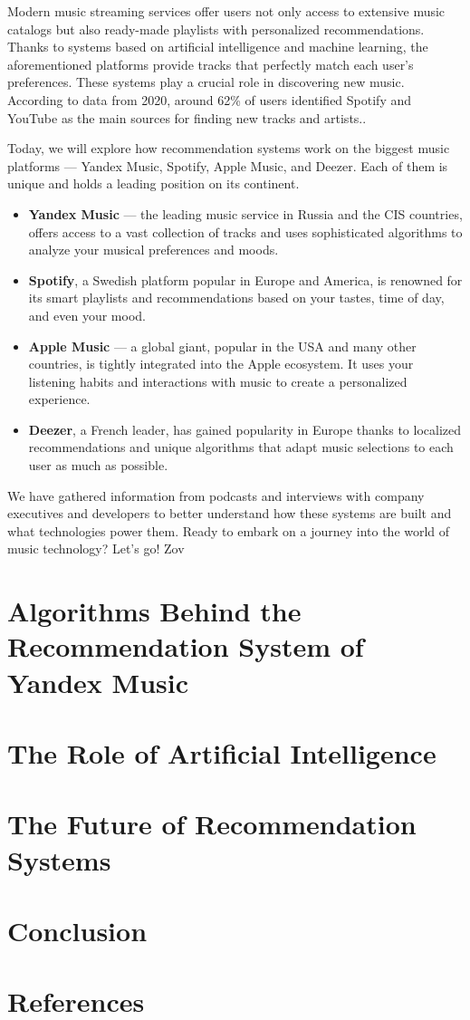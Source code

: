 \documentclass[14pt,a4paper]{article}
\begin{document}
Modern music streaming services offer users not only access to extensive music catalogs but also ready-made playlists with personalized recommendations. Thanks to systems based on artificial intelligence and machine learning, the aforementioned platforms provide tracks that perfectly match each user's preferences. These systems play a crucial role in discovering new music. According to data from 2020, around 62\% of users identified Spotify and YouTube as the main sources for finding new tracks and artists.\citep{href}.

Today, we will explore how recommendation systems work on the biggest music platforms — Yandex Music, Spotify, Apple Music, and Deezer. Each of them is unique and holds a leading position on its continent.
\begin{itemize}
 \item \textbf{Yandex Music} — the leading music service in Russia and the CIS countries, offers access to a vast collection of tracks and uses sophisticated algorithms to analyze your musical preferences and moods.

\item \textbf{Spotify}, a Swedish platform popular in Europe and America, is renowned for its smart playlists and recommendations based on your tastes, time of day, and even your mood.

\item \textbf{Apple Music} — a global giant, popular in the USA and many other countries, is tightly integrated into the Apple ecosystem. It uses your listening habits and interactions with music to create a personalized experience.

\item \textbf{Deezer}, a French leader, has gained popularity in Europe thanks to localized recommendations and unique algorithms that adapt music selections to each user as much as possible.
\end{itemize}
We have gathered information from podcasts and interviews with company executives and developers to better understand how these systems are built and what technologies power them. Ready to embark on a journey into the world of music technology? Let's go!
Zov

\section{Algorithms Behind the Recommendation System of Yandex Music}

\section{The Role of Artificial Intelligence}

\section{The Future of Recommendation Systems}

\section{Conclusion}

\newpage
\section{References}



\end{document}
